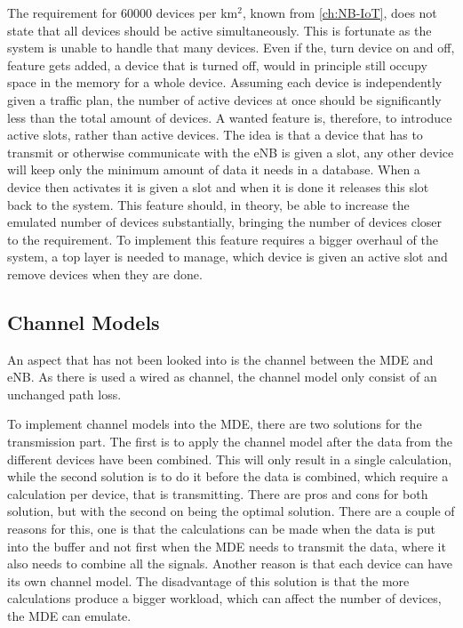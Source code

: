 The requirement for 60000 devices per km$^2$, known from \autoref{ch:NB-IoT}, does not state that all devices should be active simultaneously. This is fortunate as the system is unable to handle that many devices. Even if the, turn device on and off, feature gets added, a device that is turned off, would in principle still occupy space in the memory for a whole device. Assuming each device is independently given a traffic plan, the number of active devices at once should be significantly less than the total amount of devices. A wanted feature is, therefore, to introduce active slots, rather than active devices. The idea is that a device that has to transmit or otherwise communicate with the eNB is given a slot, any other device will keep only the minimum amount of data it needs in a database. When a device then activates it is given a slot and when it is done it releases this slot back to the system. This feature should, in theory, be able to increase the emulated number of devices substantially, bringing the number of devices closer to the requirement. To implement this feature requires a bigger overhaul of the system, a top layer is needed to manage, which device is given an active slot and remove devices when they are done.



\subsection{Channel Models}
An aspect that has not been looked into is the channel between the MDE and eNB. As there is used a wired as channel, the channel model only consist of an unchanged path loss. 

To implement channel models into the MDE, there are two solutions for the transmission part. The first is to apply the channel model after the data from the different devices have been combined. This will only result in a single calculation, while the second solution is to do it before the data is combined, which require a calculation per device, that is transmitting. There are pros and cons for both solution, but with the second on being the optimal solution. There are a couple of reasons for this, one is that the calculations can be made when the data is put into the buffer and not first when the MDE needs to transmit the data, where it also needs to combine all the signals. Another reason is that each device can have its own channel model. The disadvantage of this solution is that the more calculations produce a bigger workload, which can affect the number of devices, the MDE can emulate.

